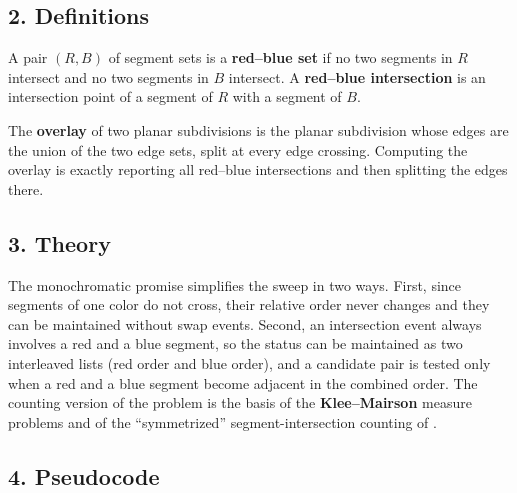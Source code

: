 \subsection{2. Definitions}

\begin{definition}\label{def:segint_red_blue_set}
  A pair $(R,B)$ of segment sets is a \textbf{red--blue set} if no two
  segments in $R$ intersect and no two segments in $B$ intersect. A
  \textbf{red--blue intersection} is an intersection point of a segment of
  $R$ with a segment of $B$.
\end{definition}

\begin{definition}\label{def:segint_overlay}
  The \textbf{overlay} of two planar subdivisions is the planar subdivision
  whose edges are the union of the two edge sets, split at every edge
  crossing. Computing the overlay is exactly reporting all red--blue
  intersections and then splitting the edges there.
\end{definition}

\subsection{3. Theory}

The monochromatic promise simplifies the sweep in two ways. First, since
segments of one color do not cross, their relative order never changes and
they can be maintained without swap events. Second, an intersection event
always involves a red and a blue segment, so the status can be maintained as
two interleaved lists (red order and blue order), and a candidate pair is
tested only when a red and a blue segment become adjacent in the combined
order. The counting version of the problem is the basis of the
\textbf{Klee--Mairson} measure problems and of the ``symmetrized''
segment-intersection counting of \cite{mairson1988}.

\subsection{4. Pseudocode}

